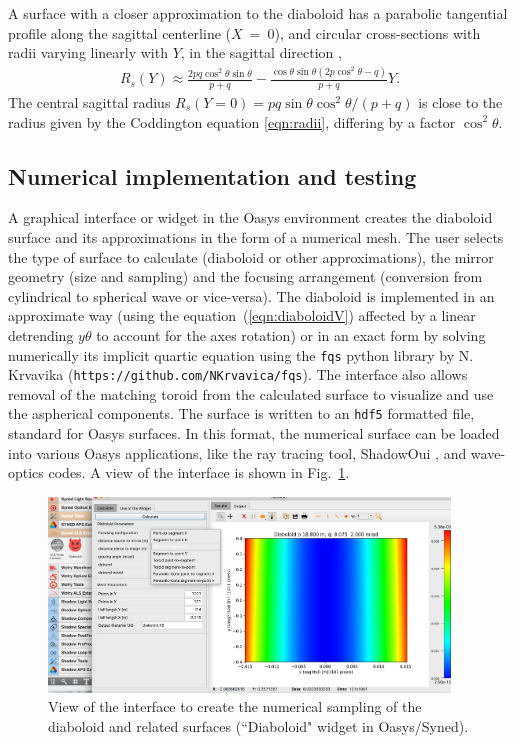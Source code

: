 \documentclass{iucr}       %
\begin{document}

A surface with a closer approximation to the diaboloid has a parabolic tangential profile along the sagittal centerline ($X$~=~0), and circular cross-sections with radii varying linearly with $Y$, in the sagittal direction \cite{val2021},
\begin{multline}
\label{eq:sagRadius}
R_s(Y) 
\approx 
\frac{2p q \cos^2\theta \sin\theta }{p + q} - 
\frac{\cos\theta \sin\theta (2 p \cos^2\theta - q)}{p + q} Y.
\end{multline}
The central sagittal radius $R_s(Y=0)=p q \sin\theta \cos^2\theta/ (p+q)$ is close to the radius given by the Coddington equation \ref{eqn:radii}, differing by a factor $\cos^2\theta$.


\subsection{Numerical implementation and testing}
\label{sec:oasys}

A graphical interface or widget in the Oasys environment creates the diaboloid surface and its approximations in the form of a numerical mesh. The user selects the type of surface to calculate (diaboloid or other approximations), the mirror geometry (size and sampling) and the focusing arrangement (conversion from cylindrical to spherical wave or vice-versa). 
The diaboloid is implemented in an approximate way (using the equation~(\ref{eqn:diaboloidV}) affected by a linear detrending $y\theta$ to account for the axes rotation) or in an exact form by solving numerically its implicit quartic equation \cite{val2021} using the {\tt fqs} python library by N. Krvavika ({\tt https://github.com/NKrvavica/fqs}). 
The interface also allows removal of the matching toroid from the calculated surface to visualize and use the aspherical components. The surface is written to an {\tt hdf5} formatted file, standard for Oasys surfaces. In this format, the numerical surface can be loaded into various Oasys applications, like the ray tracing tool, ShadowOui \cite{codeSHADOWOUI}, and wave-optics codes. A view of the interface is shown in Fig.~\ref{fig:widget}.

\begin{figure}\label{fig:widget}
\centering
\includegraphics[width=0.95\textwidth]{figures/widget.png}
\caption{View of the interface to create the numerical sampling of the diaboloid and related surfaces (``Diaboloid" widget in Oasys/Syned).}
\end{figure}
\end{document}
